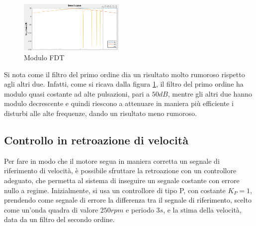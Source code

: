 \documentclass[a4paper, 11pt]{article}
\begin{document}
\begin{figure}
  \begin{center} 
    \includegraphics[width=0.45\textwidth]{./Images/speed_filter_responses.png}
  \end{center}
  \caption{Modulo FDT}
  \label{Lab5:mags}
\end{figure}

Si nota come il filtro del primo ordine dia un risultato molto rumoroso rispetto agli altri due. Infatti, come si ricava dalla figura \ref{Lab5:mags}, il filtro del primo ordine ha modulo quasi costante ad alte pulsazioni, pari a $50 dB$, mentre gli altri due hanno modulo decrescente e quindi riescono a attenuare in maniera più efficiente i disturbi alle alte frequenze, dando un risultato meno rumoroso.

\subsection{Controllo in retroazione di velocità}
Per fare in modo che il motore segua in maniera corretta un segnale di riferimento di velocità, è possibile sfruttare la retroazione con un controllore adeguato, che permetta al sistema di inseguire un segnale costante con errore nullo a regime. Inizialmente, si usa un controllore di tipo P, con costante $K_{P} = 1$, prendendo come segnale di errore la differenza tra il segnale di riferimento, scelto come un'onda quadra di valore $250 rpm$ e periodo $3s$, e la stima della velocità, data da un filtro del secondo ordine. 
\end{document}
